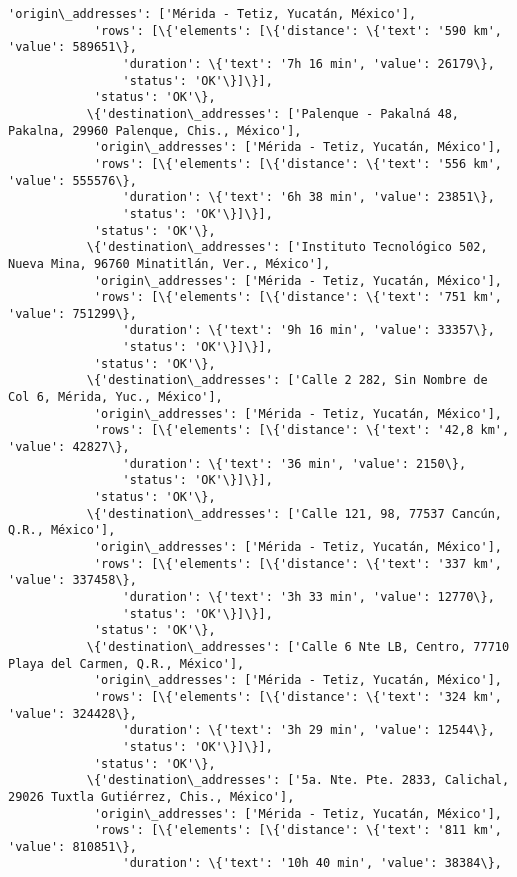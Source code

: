 \documentclass[11pt]{article}
\begin{document}
\begin{Verbatim}[commandchars=\\\{\}]
            'origin\_addresses': ['Mérida - Tetiz, Yucatán, México'],
            'rows': [\{'elements': [\{'distance': \{'text': '590 km', 'value': 589651\},
                'duration': \{'text': '7h 16 min', 'value': 26179\},
                'status': 'OK'\}]\}],
            'status': 'OK'\},
           \{'destination\_addresses': ['Palenque - Pakalná 48, Pakalna, 29960 Palenque, Chis., México'],
            'origin\_addresses': ['Mérida - Tetiz, Yucatán, México'],
            'rows': [\{'elements': [\{'distance': \{'text': '556 km', 'value': 555576\},
                'duration': \{'text': '6h 38 min', 'value': 23851\},
                'status': 'OK'\}]\}],
            'status': 'OK'\},
           \{'destination\_addresses': ['Instituto Tecnológico 502, Nueva Mina, 96760 Minatitlán, Ver., México'],
            'origin\_addresses': ['Mérida - Tetiz, Yucatán, México'],
            'rows': [\{'elements': [\{'distance': \{'text': '751 km', 'value': 751299\},
                'duration': \{'text': '9h 16 min', 'value': 33357\},
                'status': 'OK'\}]\}],
            'status': 'OK'\},
           \{'destination\_addresses': ['Calle 2 282, Sin Nombre de Col 6, Mérida, Yuc., México'],
            'origin\_addresses': ['Mérida - Tetiz, Yucatán, México'],
            'rows': [\{'elements': [\{'distance': \{'text': '42,8 km', 'value': 42827\},
                'duration': \{'text': '36 min', 'value': 2150\},
                'status': 'OK'\}]\}],
            'status': 'OK'\},
           \{'destination\_addresses': ['Calle 121, 98, 77537 Cancún, Q.R., México'],
            'origin\_addresses': ['Mérida - Tetiz, Yucatán, México'],
            'rows': [\{'elements': [\{'distance': \{'text': '337 km', 'value': 337458\},
                'duration': \{'text': '3h 33 min', 'value': 12770\},
                'status': 'OK'\}]\}],
            'status': 'OK'\},
           \{'destination\_addresses': ['Calle 6 Nte LB, Centro, 77710 Playa del Carmen, Q.R., México'],
            'origin\_addresses': ['Mérida - Tetiz, Yucatán, México'],
            'rows': [\{'elements': [\{'distance': \{'text': '324 km', 'value': 324428\},
                'duration': \{'text': '3h 29 min', 'value': 12544\},
                'status': 'OK'\}]\}],
            'status': 'OK'\},
           \{'destination\_addresses': ['5a. Nte. Pte. 2833, Calichal, 29026 Tuxtla Gutiérrez, Chis., México'],
            'origin\_addresses': ['Mérida - Tetiz, Yucatán, México'],
            'rows': [\{'elements': [\{'distance': \{'text': '811 km', 'value': 810851\},
                'duration': \{'text': '10h 40 min', 'value': 38384\},

\end{Verbatim}
\end{document}
